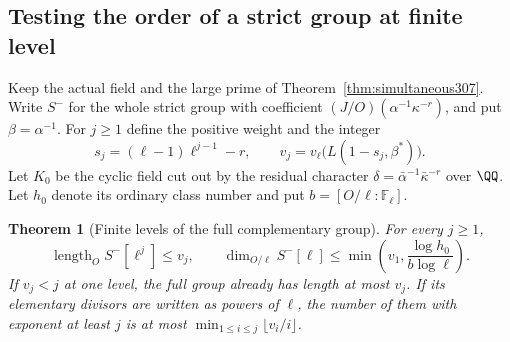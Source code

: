 \documentclass[a4paper,11pt]{article}
\newtheorem{theorem}[proposition]{Theorem}
\theoremstyle{definition}
\theoremstyle{remark}
\numberwithin{equation}{section}
\begin{document}
\subsection{Testing the order of a strict group at finite level}\label{nav:III-70}
Keep the actual field and the large prime of
Theorem~\ref{thm:simultaneous307}. Write \(S^-\) for the
whole strict group with coefficient \((J/O)(\alpha^{-1}\kappa^{-r})\),
and put \(\beta=\alpha^{-1}\). For \(j\ge1\) define the
positive weight and the integer
\[
        s_j=(\ell-1)\ell^{j-1}-r,\qquad
        v_j=v_\ell\big(L(1-s_j,\beta^*)\big).
\]
Let \(K_0\) be the cyclic field cut out by the residual
character \(\delta=\bar\alpha^{-1}\bar\kappa^{-r}\) over
\(\QQ\). Let \(h_0\) denote its ordinary class number and put
\(b=[O/\ell:\mathbb F_\ell]\).

\begin{theorem}[Finite levels of the full complementary group]\leavevmode
\label{thm:layers308}
For every \(j\ge1\),
\[
 \operatorname{length}_O S^-[\ell^j]\le v_j,\qquad
 \dim_{O/\ell} S^-[\ell]\le
       \min\left(v_1,\frac{\log h_0}{b\log\ell}\right).
\]
If \(v_j<j\) at one level, the full group already has
length at most \(v_j\). If its elementary divisors are written
as powers of \(\ell\), the number of them with exponent at
least \(j\) is at most
\(\min_{1\le i\le j}\lfloor v_i/i\rfloor\).
\end{theorem}
\end{document}
